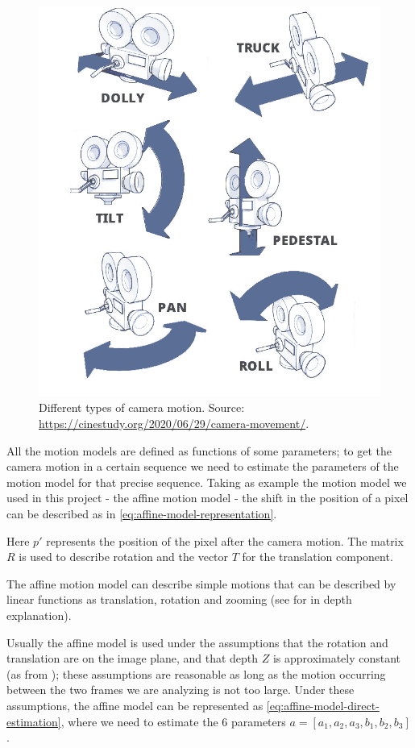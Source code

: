 \begin{figure}
    \centering
    \includegraphics[width=.9\linewidth]{../assets/images/camera-movement.png}
    \caption{Different types of camera motion. Source: \url{https://cinestudy.org/2020/06/29/camera-movement/}.}
    \label{fig:camera-motion}
\end{figure}

All the motion models are defined as functions of some parameters; to get the camera motion in a certain sequence we need to estimate the parameters of the motion model for that precise sequence. Taking as example the motion model we used in this project - the affine motion model - the shift in the position of a pixel can be described as in \cref{eq:affine-model-representation}.



Here $p'$ represents the position of the pixel after the camera motion. The matrix $R$ is used to describe rotation and the vector $T$ for the translation component.

The affine motion model can describe simple motions that can be described by linear functions as translation, rotation and zooming (see \cite{Ren20} for in depth explanation).

Usually the affine model is used under the assumptions that the rotation and translation are on the image plane, and that depth $Z$ is approximately constant (as from \cite{WangBook}); these assumptions are reasonable as long as the motion occurring between the two frames we are analyzing is not too large.
Under these assumptions, the affine model can be represented as \cref{eq:affine-model-direct-estimation}, where we need to estimate the 6 parameters $a =[a_1, a_2, a_3, b_1, b_2, b_3 ]$.

